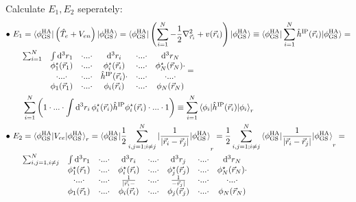 \documentclass{article}
\newcommand{\diff}{\mathrm{d}}
\newcommand{\lr}[1]{\left(#1\right)}
\begin{document}
{	Calculate $E_1, E_2$ seperately:
		\begin{align*}
			\bullet\ E_1 &= \braket{ \phi_\text{GS}^\text{HA} | \lr{ \hat{T}_e + V_{en} } | \phi_\text{GS}^\text{HA} } = \braket{ \phi_\text{GS}^\text{HA} | \lr{ \sum_{i=1}^N -\frac{1}{2} \nabla_{\vec{r}_i}^2 + v(\vec{r}_i) } | \phi_\text{GS}^\text{HA} } \equiv \braket{ \phi_\text{GS}^\text{HA} | \sum_{i=1}^N \hat{h}^\text{IP}(\vec{r}_i) | \phi_\text{GS}^\text{HA} } = \\
			& \begin{matrix}
				\sum_{i=1}^N & \int \diff^3r_1 & \cdot ... \cdot & \diff^3r_i & \cdot ... \cdot & \diff^3r_N \\
				& \phi_1^\star(\vec{r}_1) & \cdot ... \cdot & \phi_i^\star(\vec{r}_i) & \cdot ... \cdot & \phi_N^\star(\vec{r}_N) \cdot \\
		& \cdot ... \cdot & \cdot ... \cdot & \hat{h}^\text{IP}(\vec{r}_i) \cdot & \cdot ... \cdot & \cdot ... \cdot \\
		& \phi_1(\vec{r}_1) & \cdot ... \cdot & \phi_i(\vec{r}_i) & \cdot ... \cdot & \phi_N(\vec{r}_N)
			\end{matrix}	 = \\
		& \sum_{i=1}^N \lr{ 1 \cdot ... \cdot \int \diff^3r_i\, \phi_i^\star(\vec{r}_i) \hat{h}^\text{IP} \phi_i^\star(\vec{r}_i) \cdot ... \cdot 1} \equiv \sum_{i=1}^N \braket{ \phi_i | \hat{h}^\text{IP}(\vec{r}_i) | \phi_i}_r \\
			\bullet\ E_2 &= \braket{ \phi_\text{GS}^\text{HA} | V_{ee} |  \phi_\text{GS}^\text{HA} }_r = \braket{ \phi_\text{GS}^\text{HA} | \frac{1}{2} \sum_{i,j=1; i\neq j}^N | \frac{1}{| \vec{r}_i - \vec{r}_j |} |  \phi_\text{GS}^\text{HA} }_r = \frac{1}{2} \sum_{i,j=1; i\neq j}^N \braket{ \phi_\text{GS}^\text{HA} | \frac{1}{| \vec{r}_i - \vec{r}_j |} | \phi_\text{GS}^\text{HA} }_r = \\
			& \begin{matrix}
				\sum_{i,j=1,i\neq j}^N & \int \diff^3r_1 & \cdot ... \cdot & \diff^3r_i & \cdot ... \cdot & \diff^3r_j & \cdot ... \cdot & \diff^3r_N \\
				& \phi_1^\star(\vec{r}_1) & \cdot ... \cdot & \phi_i^\star(\vec{r}_i) & \cdot ... \cdot & \phi_j^\star(\vec{r}_j) & \cdot ... \cdot & \phi_N^\star(\vec{r}_N) \cdot \\
		& \cdot ... \cdot & \cdot ... \cdot & \frac{1}{| \vec{r}_i - } & \cdot ... \cdot & \frac{1}{- \vec{r}_j | } & \cdot ... \cdot & \cdot ... \cdot \\
		& \phi_1(\vec{r}_1) & \cdot ... \cdot & \phi_i(\vec{r}_i) & \cdot ... \cdot & \phi_j(\vec{r}_j) & \cdot ... \cdot & \phi_N(\vec{r}_N)

\end{matrix}
\end{align*}}
\end{document}
